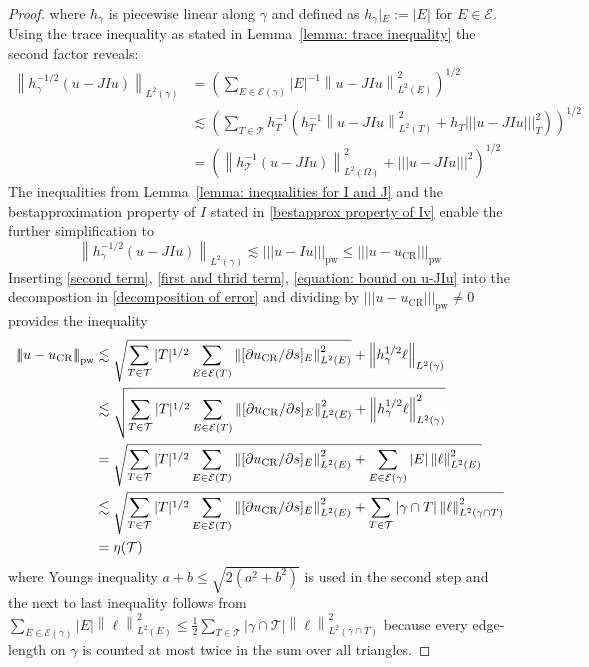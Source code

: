 \documentclass[11pt,a4paper]{article}
\newcommand{\uCR}{u_{\mathrm{CR}}}
\newcommand{\norm}[1]{\left \lVert #1 \right \rVert}
\newcommand{\Ltwo}[2]{\left\lVert #1 \right\rVert_{L^2(#2)}}
\newcommand{\enorm}[1]{\left\lvert\!\left\lvert\!\left\lvert #1 \right\rvert\!\right\rvert\!\right\rvert}
\newcommand{\pwenorm}[1]{\left\lvert\!\left\lvert\!\left\lvert #1 \right\rvert\!\right\rvert\!\right\rvert_{\mathrm{pw}}}
\begin{document}
\begin{proof}
where \(h_\gamma\) is piecewise linear along \(\gamma\) and defined as \(h_\gamma|_E := |E|\) for \(E \in \mathcal{E}\). Using the trace inequality as stated in Lemma~\ref{lemma: trace inequality} the second factor reveals: 
\begin{align*}
\Ltwo{h_\gamma^{-1/2}(u-JIu)}{\gamma} &= \left(\sum_{E \in \mathcal{E}(\gamma)} |E|^{-1} \Ltwo{u-JIu}{E}^2 \right)^{1/2} \\
&\lesssim \left(\sum_{T \in \mathcal{T}} h_T^{-1}\left(h_T^{-1} \Ltwo{u-JIu}{T}^2 + h_T \enorm{u-JIu}_T^2 \right) \right)^{1/2} \\
&= \left(\Ltwo{h_\mathcal{T}^{-1} (u-JIu)}{\Omega}^2 +\enorm{u-JIu}^2 \right)^{1/2}
\end{align*}
The inequalities from Lemma~\ref{lemma: inequalities for I and J} and the bestapproximation property of \(I\) stated in \eqref{bestapprox property of Iv} enable the further simplification to 
\begin{equation}
\Ltwo{h_\gamma^{-1/2}(u-JIu)}{\gamma} \lesssim \pwenorm{u-Iu} \le \pwenorm{u-\uCR} \label{equation: bound on u-JIu} 
\end{equation}
Inserting \eqref{second term}, \eqref{first and thrid term}, \eqref{equation: bound on u-JIu} into the decompostion in \eqref{decomposition of error} and dividing by \(\pwenorm{u-\uCR} \neq 0\) provides the inequality
\begin{align}
    \pwenorm{u-\uCR} &\lesssim \sqrt{\sum_{T \in \mathcal{T}}|T|^{1/2} \sum_{E \in \mathcal{E}(T)} \norm{[\partial \uCR/\partial s]_E}^2_{L^2(E)}} + \Ltwo{h_\gamma^{1/2} \ell}{\gamma} \notag\\
    &\lesssim \sqrt{\sum_{T \in \mathcal{T}}|T|^{1/2} \sum_{E \in \mathcal{E}(T)} \norm{[\partial \uCR/\partial s]_E}^2_{L^2(E)} + \Ltwo{h_\gamma^{1/2} \ell}{\gamma}^2} \notag\\
    &= \sqrt{\sum_{T \in \mathcal{T}}|T|^{1/2} \sum_{E \in \mathcal{E}(T)} \norm{[\partial \uCR/\partial s]_E}^2_{L^2(E)} + \sum_{E \in \mathcal{E}(\gamma)} |E| \Ltwo{\ell}{E}^2} \notag\\
    &\lesssim \sqrt{\sum_{T \in \mathcal{T}}|T|^{1/2} \sum_{E \in \mathcal{E}(T)} \norm{[\partial \uCR/\partial s]_E}^2_{L^2(E)} + \sum_{T \in \mathcal{T}} |\gamma \cap T| \Ltwo{\ell}{\gamma \cap T}^2} \notag\\
    &= \eta(\mathcal{T}) \notag
\end{align}
where Youngs inequality \(a+b \le \sqrt{2(a^2 + b^2)}\) is used in the second step and the next to last inequality follows from \(  \sum_{E \in \mathcal{E}(\gamma)} |E| \Ltwo{\ell}{E}^2 \le \frac{1}{2} \sum_{T \in \mathcal{T}} |\gamma \cap \mathcal{T}| \Ltwo{\ell}{\gamma \cap T}^2\) because every edge-length on \(\gamma\) is counted at most twice in the sum over all triangles. 


\end{proof}
\end{document}
